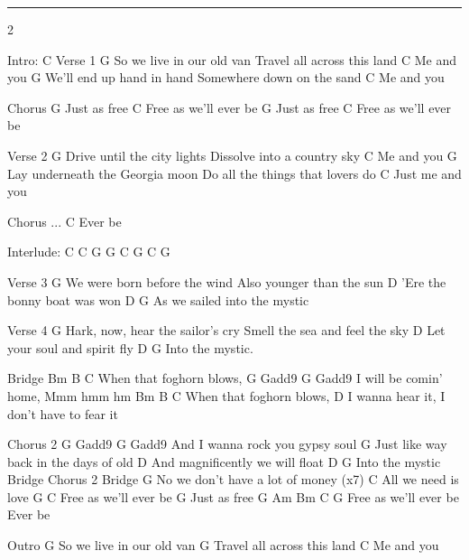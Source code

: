 \noindent\rule{\columnwidth}{1pt}

\begin{multicols}{2}
\begin{lstsong}
Intro: C
Verse 1
G
So we live in our old van
Travel all across this land
C
Me and you
G
We'll end up hand in hand
Somewhere down on the sand
C
Me and you
 
Chorus
G
Just as free
               C
Free as we'll ever be
             G
Just as free
                 C
Free as we'll ever be
 
Verse 2
G
Drive until the city lights
Dissolve into a country sky
C
Me and you
G
Lay underneath the Georgia moon
Do all the things that lovers do
C
Just me and you
 
Chorus ...  C
            Ever be
 
Interlude: C C G G C G C G
 
Verse 3
G
We were born before the wind
Also younger than the sun
D
'Ere the bonny boat was won
D  G
As we sailed into the mystic
\end{lstsong}
\columnbreak
\begin{lstsong}
Verse 4
G
Hark, now, hear the sailor's cry
Smell the sea and feel the sky
D
Let your soul and spirit fly
D G
Into the mystic.
 
Bridge
Bm B C
    When that foghorn blows,
G Gadd9  G Gadd9
I will be comin' home,    Mmm hmm hm
Bm B C
    When that foghorn blows,
D
  I wanna hear it, I don't have to fear it

Chorus 2
    G   Gadd9   G  Gadd9
And I  wanna rock you gypsy soul
G
Just like way back in the days of old
D
And magnificently we will float
D         G
Into the mystic
Bridge
Chorus 2
Bridge
G
No we don't have a lot of money (x7)
             C
All we need is love
G             C
Free as we'll ever be
           G
Just as free
G    Am       Bm    C         G
Free as we'll ever be    Ever be

Outro
G
So we live in our old van
G
Travel all across this land
C
Me and you
\end{lstsong}
\end{multicols}
\newpage

